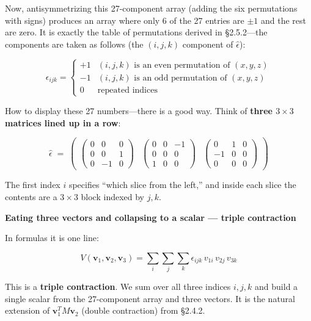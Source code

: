 \documentclass[a4paper,12pt,openany]{book}
\begin{document}
Now, antisymmetrizing this 27-component array (adding the six
permutations with signs) produces an array where only 6 of the 27
entries are \(\pm 1\) and the rest are zero. It is exactly the table of
permutations derived in §2.5.2—the components are taken as follows
(the \((i,j,k)\) component of \(\widehat{\epsilon}\)):

\[
\epsilon_{ijk} = \begin{cases} +1 & (i,j,k) \text{ is an even permutation of } (x,y,z) \\ -1 & (i,j,k) \text{ is an odd permutation of } (x,y,z) \\ 0 & \text{repeated indices} \end{cases}
\]

How to display these 27 numbers—there is a good way. Think of
\textbf{three $3 \times 3$ matrices lined up in a row}:

\[
\widehat{\epsilon} \;{=}\;
\begin{pmatrix}
\begin{pmatrix} 0 & 0 & 0 \\ 0 & 0 & 1 \\ 0 & -1 & 0 \end{pmatrix} &
\begin{pmatrix} 0 & 0 & -1 \\ 0 & 0 & 0 \\ 1 & 0 & 0 \end{pmatrix} &
\begin{pmatrix} 0 & 1 & 0 \\ -1 & 0 & 0 \\ 0 & 0 & 0 \end{pmatrix}
\end{pmatrix}
\]

The first index \(i\) specifies ``which slice from the left,'' and
inside each slice the contents are a \(3 \times 3\) block indexed by
\(j,k\).

\textbf{Eating three vectors and collapsing to a scalar — triple contraction}

In formulas it is one line:

\[
V(\mathbf{v}_1, \mathbf{v}_2, \mathbf{v}_3) = \sum_i\sum_j\sum_k \epsilon_{ijk}\, v_{1i}\, v_{2j}\, v_{3k}
\]

This is a \textbf{triple contraction}. We sum over all three indices
\(i, j, k\) and build a single scalar from the 27-component array and
three vectors. It is the natural extension of
\(\mathbf{v}_1^T M \mathbf{v}_2\) (double contraction) from §2.4.2.
\end{document}
